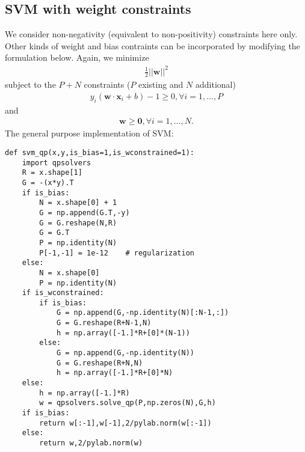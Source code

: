 \documentclass[11pt]{article}
\renewcommand{\[}{\begin{equation}}
\renewcommand{\]}{\end{equation}}
\begin{document}
\subsection*{SVM with weight constraints}
We consider non-negativity (equivalent to non-positivity) constraints here only. Other kinds of weight and bias contraints can be incorporated by modifying the formulation below.
Again,  we minimize 
\begin{eqnarray}
\frac{1}{2}||\textbf{w}||^2
\end{eqnarray}
subject to the $P+N$ constraints ($P$ existing and $N$ additional)
\begin{eqnarray}
y_i(\textbf{w}\cdot\textbf{x}_i +b)- 1 \geq 0, \forall i=1,\ldots,P
\end{eqnarray}
and 
\begin{eqnarray}
\textbf{w} \geq \textbf{0}, \forall i=1,\ldots,N.
\end{eqnarray}
The general purpose implementation of SVM:
\begin{lstlisting}
def svm_qp(x,y,is_bias=1,is_wconstrained=1):
	import qpsolvers
	R = x.shape[1]
	G = -(x*y).T
	if is_bias:
		N = x.shape[0] + 1
		G = np.append(G.T,-y)
		G = G.reshape(N,R)
		G = G.T
		P = np.identity(N)
		P[-1,-1] = 1e-12    # regularization
	else:
		N = x.shape[0]
		P = np.identity(N)
	if is_wconstrained:
		if is_bias:
			G = np.append(G,-np.identity(N)[:N-1,:])
			G = G.reshape(R+N-1,N)
			h = np.array([-1.]*R+[0]*(N-1))
		else:
			G = np.append(G,-np.identity(N))
			G = G.reshape(R+N,N)
			h = np.array([-1.]*R+[0]*N)
	else:
		h = np.array([-1.]*R)
		w = qpsolvers.solve_qp(P,np.zeros(N),G,h)
	if is_bias:
		return w[:-1],w[-1],2/pylab.norm(w[:-1])
	else:
		return w,2/pylab.norm(w)
\end{lstlisting}





%
%
\end{document}
